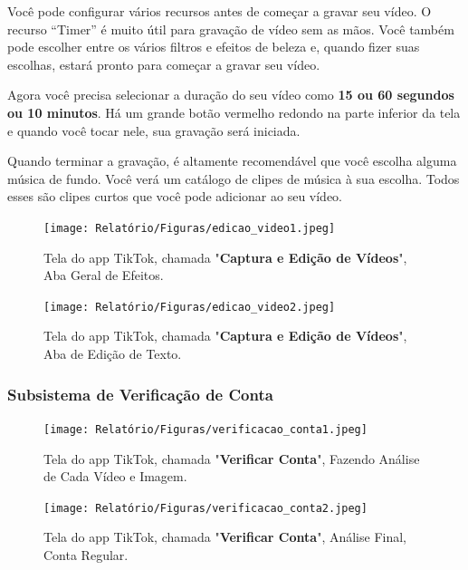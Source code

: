 Você pode configurar vários recursos antes de começar a gravar seu vídeo. O recurso “Timer” é muito útil para gravação de vídeo sem as mãos. Você também pode escolher entre os vários filtros e efeitos de beleza e, quando fizer suas escolhas, estará pronto para começar a gravar seu vídeo.\vskip0.3cm

Agora você precisa selecionar a duração do seu vídeo como\textbf{ 15 ou 60 segundos ou 10 minutos}. Há um grande botão vermelho redondo na parte inferior da tela e quando você tocar nele, sua gravação será iniciada.\vskip0.3cm

Quando terminar a gravação, é altamente recomendável que você escolha alguma música de fundo. Você verá um catálogo de clipes de música à sua escolha. Todos esses são clipes curtos que você pode adicionar ao seu vídeo.



\begin{figure}[H]
    \centering
    \begin{minipage}{0.35\textwidth}
        \centering
        \texttt{[image: Relatório/Figuras/edicao\_video1.jpeg]}
        \caption{Tela do app TikTok, chamada "\textbf{Captura e Edição de Vídeos}", Aba Geral de Efeitos.}
        \label{fig:promover_publicacao1}
    \end{minipage}\hfill
    \begin{minipage}{0.35\textwidth}
        \centering
        \texttt{[image: Relatório/Figuras/edicao\_video2.jpeg]}
        \caption{Tela do app TikTok, chamada "\textbf{Captura e Edição de Vídeos}", Aba de Edição de Texto.}
        \label{fig:promover_publicacao2}
    \end{minipage}
\end{figure}







\newpage
\subsubsection{Subsistema de Verificação de Conta}


\begin{figure}[H]
    \centering
    \begin{minipage}{0.30\textwidth}
        \centering
        \texttt{[image: Relatório/Figuras/verificacao\_conta1.jpeg]}
        \caption{Tela do app TikTok, chamada "\textbf{Verificar Conta}", Fazendo Análise de Cada Vídeo e Imagem.}
        \label{fig:promover_publicacao1}
    \end{minipage}\hfill
    \begin{minipage}{0.30\textwidth}
        \centering
        \texttt{[image: Relatório/Figuras/verificacao\_conta2.jpeg]}
        \caption{Tela do app TikTok, chamada "\textbf{Verificar Conta}", Análise Final, Conta Regular.}
        \label{fig:promover_publicacao2}
    \end{minipage}
\end{figure}

